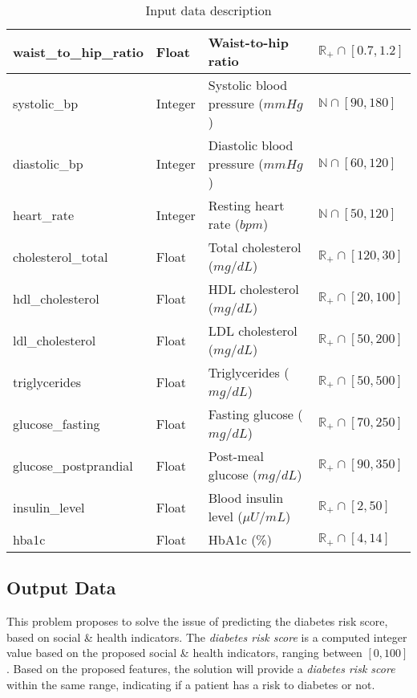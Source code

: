 \documentclass[a4paper]{article}
\begin{document}
\begin{table}[H]
\begin{tabular}{|l|l|p{5cm}|p{4cm}|}
		\hline
		waist\_to\_hip\_ratio & Float & Waist-to-hip ratio & $\mathbb{R_+} \cap [0.7, 1.2]$ \\
		\hline
		systolic\_bp & Integer & Systolic blood pressure ($mmHg$) & $\mathbb{N} \cap [90, 180]$ \\
		\hline
		diastolic\_bp & Integer & Diastolic blood pressure ($mmHg$) & $\mathbb{N} \cap [60, 120]$ \\
		\hline
		heart\_rate & Integer & Resting heart rate ($bpm$) & $\mathbb{N} \cap [50, 120]$ \\
		\hline
		cholesterol\_total & Float & Total cholesterol ($mg/dL$) & $\mathbb{R_+} \cap [120, 30]$ \\
		\hline
		hdl\_cholesterol & Float & HDL cholesterol ($mg/dL$) & $\mathbb{R_+} \cap [20, 100]$ \\
		\hline
		ldl\_cholesterol & Float & LDL cholesterol ($mg/dL$) & $\mathbb{R_+} \cap [50, 200]$ \\
		\hline
		triglycerides & Float & Triglycerides ($mg/dL$) & $\mathbb{R_+} \cap [50, 500]$ \\
		\hline
		glucose\_fasting & Float & Fasting glucose ($mg/dL$) & $\mathbb{R_+} \cap [70, 250]$ \\
		\hline
		glucose\_postprandial & Float & Post-meal glucose ($mg/dL$) & $\mathbb{R_+} \cap [90, 350]$ \\
		\hline
		insulin\_level & Float & Blood insulin level ($\mu U/mL$) & $\mathbb{R_+} \cap [2, 50]$ \\
		\hline
		hba1c & Float & HbA1c (\%) & $\mathbb{R_+} \cap [4, 14]$ \\
		\hline
	\end{tabular}
	
	\caption{Input data description}
	\label{table-input-data}
\end{table}

\subsection{Output Data}

\par This problem proposes to solve the issue of predicting the diabetes risk score, based on social \& health indicators. The \textit{diabetes risk score} is a computed integer value based on the proposed social \& health indicators, ranging between $[0, 100]$. Based on the proposed features, the solution will provide a \textit{diabetes risk score} within the same range, indicating if a patient has a risk to diabetes or not.
\end{document}
